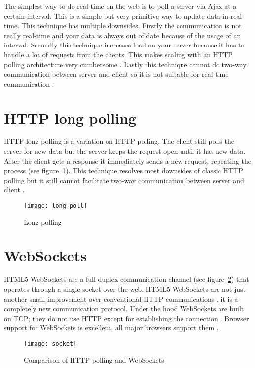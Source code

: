 The simplest way to do real-time on the web is to poll a server via Ajax at a certain interval. This is a simple but very primitive way to update data in real-time. This technique has multiple downsides. Firstly the communication is not really real-time and your data is always out of date because of the usage of an interval. Secondly this technique increases load on your server because it has to handle a lot of requests from the clients. This makes scaling with an HTTP polling architecture very cumbersome \cite{poll-socket}. Lastly this technique cannot do two-way communication between server and client so it is not suitable for real-time communication \cite{poll-socket}.

\section{HTTP long polling} %
\label{sub:long-polling}

HTTP long polling is a variation on HTTP polling. The client still polls the server for new data but the server keeps the request open until it has new data. After the client gets a response it immediately sends a new request, repeating the process \cite{long-poll} (see figure~\ref{figure:long-poll}). This technique resolves most downsides of classic HTTP polling but it still cannot facilitate two-way communication between server and client \cite{poll-socket}.

\begin{figure}[H]
	\centering
	\texttt{[image: long-poll]}
	\caption{Long polling \cite{long-poll}}
	\label{figure:long-poll}
\end{figure}

\section{WebSockets} %
\label{sub:websockets}

HTML5 WebSockets are a full-duplex communication channel (see figure~\ref{figure:socket}) that operates through a single socket over the web. HTML5 WebSockets are not just another small improvement over conventional HTTP communications \cite{poll-socket}, it is a completely new communication protocol. Under the hood WebSockets are built on TCP; they do not use HTTP except for establishing the connection \cite{socket-wiki}. Browser support for WebSockets is excellent, all major browsers support them \cite{socket-browser}.


\begin{figure}[H]
	\centering
	\texttt{[image: socket]}
	\caption{Comparison of HTTP polling and WebSockets \cite{poll-socket}}
	\label{figure:socket}
\end{figure}

